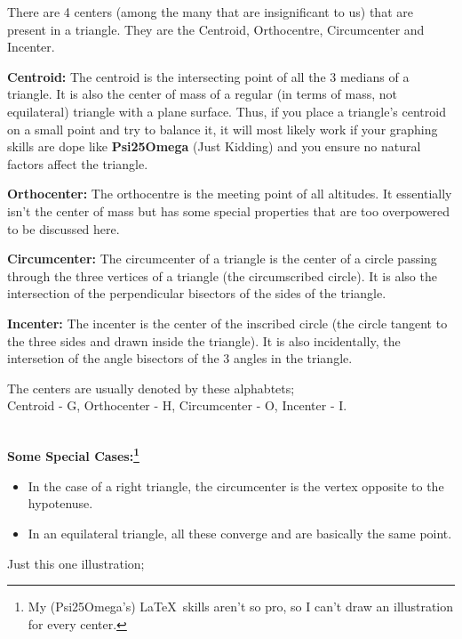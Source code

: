 \begin{mathbox}{}
{There are 4 centers (among the many that are insignificant to us) that are present in a triangle. They are the Centroid, Orthocentre, Circumcenter and Incenter.

\textbf{Centroid: }The centroid is the intersecting point of all the 3 medians of a triangle. It is also the center of mass of a regular (in terms of mass, not equilateral) triangle with a plane surface. Thus, if you place a triangle's centroid on a small point and try to balance it, it will most likely work if your graphing skills are dope like \textbf{Psi25Omega} (Just Kidding) and you ensure no natural factors affect the triangle.

\textbf{Orthocenter: }The orthocentre is the meeting point of all altitudes. It essentially isn't the center of mass but has some special properties that are too overpowered to be discussed here.

\textbf{Circumcenter: }The circumcenter of a triangle is the center of a circle passing through the three vertices of a triangle (the circumscribed circle). It is also the intersection of the perpendicular bisectors of the sides of the triangle.

\textbf{Incenter: }The incenter is the center of the inscribed circle (the circle tangent to the three sides and drawn inside the triangle). It is also incidentally, the intersetion of the angle bisectors of the 3 angles in the triangle.

The centers are usually denoted by these alphabtets;\\
Centroid - G, Orthocenter - H, Circumcenter - O, Incenter - I.

\\
\textbf{Some Special Cases:\footnote{My (Psi25Omega's) \LaTeX ~skills aren't so pro, so I can't draw an illustration for every center.} }
\begin{itemize}
    \item{In the case of a right triangle, the circumcenter is the vertex opposite to the hypotenuse.}
    \item{In an equilateral triangle, all these converge and are basically the same point.}
\end{itemize}
\begin{center}
    Just this one illustration;\\
\end{center}}
\end{mathbox}
